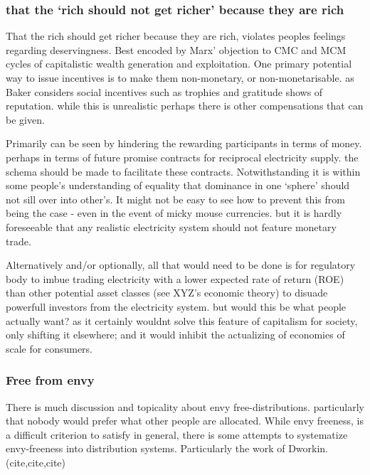 \documentclass{article}
\begin{document}
\subsubsection{that the `rich should not get richer' because they are rich}

That the rich should get richer because they are rich, violates peoples feelings regarding deservingness.
Best encoded by Marx' objection to CMC and MCM cycles of capitalistic wealth generation and exploitation.
One primary potential way to issue incentives is to make them non-monetary, or non-monetarisable. as Baker considers social incentives such as trophies and gratitude shows of reputation. while this is unrealistic perhaps there is other compensations that can be given.

Primarily can be seen by hindering the rewarding participants in terms of money.
perhaps in terms of future promise contracts for reciprocal electricity supply.
the schema should be made to facilitate these contracts.
Notwithstanding it is within some people's understanding of equality that dominance in one `sphere' should not sill over into other's.
It might not be easy to see how to prevent this from being the case - even in the event of micky mouse currencies.
but it is hardly foreseeable that any realistic electricity system should not feature monetary trade.

Alternatively and/or optionally, all that would need to be done is for regulatory body to imbue trading electricity with a lower expected rate of return (ROE) than other potential asset classes (see XYZ's economic theory) to disuade powerfull investors from the electricity system.
but would this be what people actually want? as it certainly wouldnt solve this feature of capitalism for society, only shifting it elsewhere; and it would inhibit the actualizing of economies of scale for consumers.


\subsubsection{Free from envy}

There is much discussion and topicality about envy free-distributions.
particularly that nobody would prefer what other people are allocated.
While envy freeness, is a difficult criterion to satisfy in general, there is some attempts to systematize envy-freeness into distribution systems.
Particularly the work of Dworkin. (cite,cite,cite)
\end{document}
